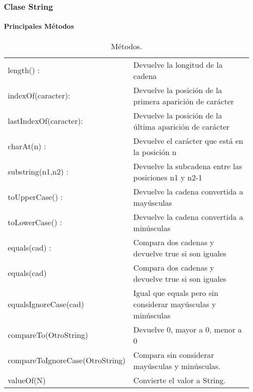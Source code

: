 \documentclass{beamer}
\begin{document}
		  \begin{frame}
			\frametitle{Clase String}
			\framesubtitle{Principales M\'etodos}
			\begin{block}{}
\begin{table}[]
\centering
\caption{M\'etodos.}
\label{my-label}
\tiny
\begin{tabular}{ll}
length()   :                     & Devuelve la longitud de la cadena                                                                   \\
indexOf(caracter):             & Devuelve la posici\'on de la primera aparici\'on de car\'acter                                            \\
lastIndexOf(caracter):         & Devuelve la posici\'on de la \'ultima aparici\'on de car\'acter                                             \\
charAt(n) :                      & Devuelve el car\'acter que est\'a en la posici\'on n                                                      \\
substring(n1,n2) :               & Devuelve la subcadena  entre las posiciones n1 y n2-1                                    \\
toUpperCase()     :              & Devuelve la cadena convertida a may\'usculas                                                          \\
toLowerCase()     :              & Devuelve la cadena convertida a min\'usculas                                                          \\
equals(cad)      :             & Compara dos cadenas y devuelve true si son iguales                                                  \\
equals(cad)                   & Compara dos cadenas y devuelve true si son iguales                                                  \\
equalsIgnoreCase(cad)         & Igual que equals pero sin considerar may\'usculas y min\'usculas                                        \\
compareTo(OtroString)           & Devuelve 0, mayor a 0, menor a 0 \\
compareToIgnoreCase(OtroString) & Compara  sin considerar may\'usculas y min\'usculas.                             \\
valueOf(N)                      & Convierte el valor  a String.                       
\end{tabular}
\end{table}
			\end{block}
		\end{frame}
\end{document}
